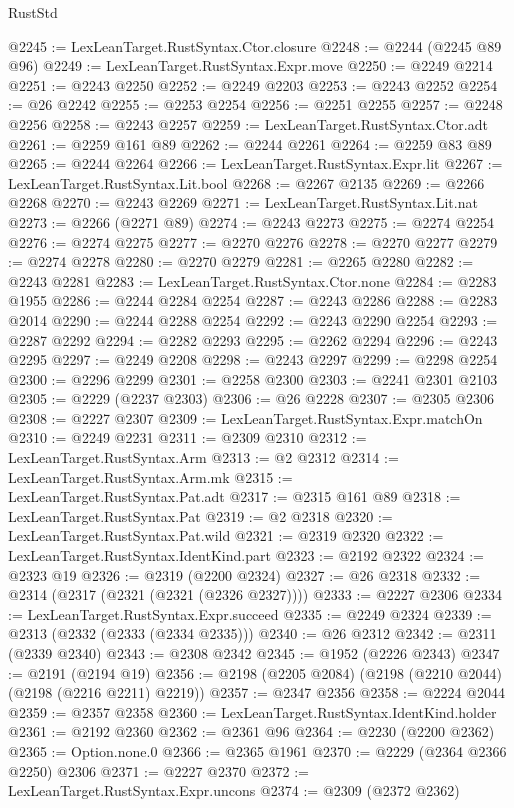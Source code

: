 \begin{lexlean}{RustStd}
\begin{coremodule}
@2245 := LexLeanTarget.RustSyntax.Ctor.closure
@2248 := @2244 (@2245 @89 @96)
@2249 := LexLeanTarget.RustSyntax.Expr.move
@2250 := @2249 @2214
@2251 := @2243 @2250
@2252 := @2249 @2203
@2253 := @2243 @2252
@2254 := @26 @2242
@2255 := @2253 @2254
@2256 := @2251 @2255
@2257 := @2248 @2256
@2258 := @2243 @2257
@2259 := LexLeanTarget.RustSyntax.Ctor.adt
@2261 := @2259 @161 @89
@2262 := @2244 @2261
@2264 := @2259 @83 @89
@2265 := @2244 @2264
@2266 := LexLeanTarget.RustSyntax.Expr.lit
@2267 := LexLeanTarget.RustSyntax.Lit.bool
@2268 := @2267 @2135
@2269 := @2266 @2268
@2270 := @2243 @2269
@2271 := LexLeanTarget.RustSyntax.Lit.nat
@2273 := @2266 (@2271 @89)
@2274 := @2243 @2273
@2275 := @2274 @2254
@2276 := @2274 @2275
@2277 := @2270 @2276
@2278 := @2270 @2277
@2279 := @2274 @2278
@2280 := @2270 @2279
@2281 := @2265 @2280
@2282 := @2243 @2281
@2283 := LexLeanTarget.RustSyntax.Ctor.none
@2284 := @2283 @1955
@2286 := @2244 @2284 @2254
@2287 := @2243 @2286
@2288 := @2283 @2014
@2290 := @2244 @2288 @2254
@2292 := @2243 @2290 @2254
@2293 := @2287 @2292
@2294 := @2282 @2293
@2295 := @2262 @2294
@2296 := @2243 @2295
@2297 := @2249 @2208
@2298 := @2243 @2297
@2299 := @2298 @2254
@2300 := @2296 @2299
@2301 := @2258 @2300
@2303 := @2241 @2301 @2103
@2305 := @2229 (@2237 @2303)
@2306 := @26 @2228
@2307 := @2305 @2306
@2308 := @2227 @2307
@2309 := LexLeanTarget.RustSyntax.Expr.matchOn
@2310 := @2249 @2231
@2311 := @2309 @2310
@2312 := LexLeanTarget.RustSyntax.Arm
@2313 := @2 @2312
@2314 := LexLeanTarget.RustSyntax.Arm.mk
@2315 := LexLeanTarget.RustSyntax.Pat.adt
@2317 := @2315 @161 @89
@2318 := LexLeanTarget.RustSyntax.Pat
@2319 := @2 @2318
@2320 := LexLeanTarget.RustSyntax.Pat.wild
@2321 := @2319 @2320
@2322 := LexLeanTarget.RustSyntax.IdentKind.part
@2323 := @2192 @2322
@2324 := @2323 @19
@2326 := @2319 (@2200 @2324)
@2327 := @26 @2318
@2332 := @2314 (@2317 (@2321 (@2321 (@2326 @2327))))
@2333 := @2227 @2306
@2334 := LexLeanTarget.RustSyntax.Expr.succeed
@2335 := @2249 @2324
@2339 := @2313 (@2332 (@2333 (@2334 @2335)))
@2340 := @26 @2312
@2342 := @2311 (@2339 @2340)
@2343 := @2308 @2342
@2345 := @1952 (@2226 @2343)
@2347 := @2191 (@2194 @19)
@2356 := @2198 (@2205 @2084) (@2198 (@2210 @2044) (@2198 (@2216 @2211) @2219))
@2357 := @2347 @2356
@2358 := @2224 @2044
@2359 := @2357 @2358
@2360 := LexLeanTarget.RustSyntax.IdentKind.holder
@2361 := @2192 @2360
@2362 := @2361 @96
@2364 := @2230 (@2200 @2362)
@2365 := Option.none.{0}
@2366 := @2365 @1961
@2370 := @2229 (@2364 @2366 @2250) @2306
@2371 := @2227 @2370
@2372 := LexLeanTarget.RustSyntax.Expr.uncons
@2374 := @2309 (@2372 @2362)

\end{coremodule}
\end{lexlean}
